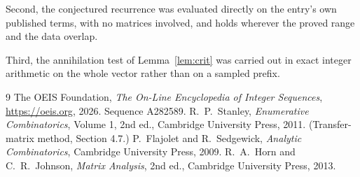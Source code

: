 \documentclass[11pt,a4paper]{article}
\theoremstyle{plain}
\theoremstyle{definition}
\begin{document}
Second, the conjectured recurrence was evaluated directly on the entry's own published terms,
with no matrices involved, and holds wherever the proved range and the data overlap.

Third, the annihilation test of Lemma~\ref{lem:crit} was carried out in exact integer
arithmetic on the whole vector rather than on a sampled prefix.

\begin{thebibliography}{9}
 The OEIS Foundation, \emph{The On-Line Encyclopedia of Integer
Sequences}, \url{https://oeis.org}, 2026. Sequence A282589.
 R.~P.~Stanley, \emph{Enumerative Combinatorics}, Volume 1, 2nd ed.,
Cambridge University Press, 2011. (Transfer-matrix method, Section 4.7.)
 P.~Flajolet and R.~Sedgewick, \emph{Analytic Combinatorics}, Cambridge
University Press, 2009.
 R.~A.~Horn and C.~R.~Johnson, \emph{Matrix Analysis}, 2nd ed., Cambridge
University Press, 2013.
\end{thebibliography}
\end{document}
